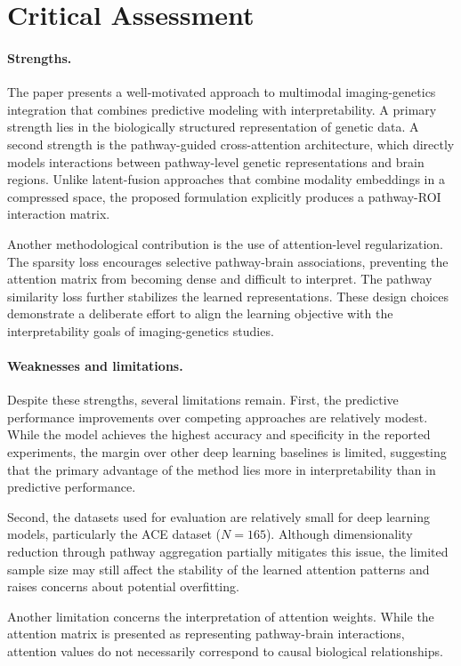 \section{Critical Assessment}

\paragraph{Strengths.}
The paper presents a well-motivated approach to multimodal imaging-genetics integration that combines predictive modeling with interpretability. A primary strength lies in the biologically structured representation of genetic data. A second strength is the pathway-guided cross-attention architecture, which directly models interactions between pathway-level genetic representations and brain regions. Unlike latent-fusion approaches that combine modality embeddings in a compressed space, the proposed formulation explicitly produces a pathway-ROI interaction matrix.

Another methodological contribution is the use of attention-level regularization. The sparsity loss encourages selective pathway-brain associations, preventing the attention matrix from becoming dense and difficult to interpret. The pathway similarity loss further stabilizes the learned representations. These design choices demonstrate a deliberate effort to align the learning objective with the interpretability goals of imaging-genetics studies.

\paragraph{Weaknesses and limitations.}
Despite these strengths, several limitations remain. First, the predictive performance improvements over competing approaches are relatively modest. While the model achieves the highest accuracy and specificity in the reported experiments, the margin over other deep learning baselines is limited, suggesting that the primary advantage of the method lies more in interpretability than in predictive performance.

Second, the datasets used for evaluation are relatively small for deep learning models, particularly the ACE dataset ($N=165$). Although dimensionality reduction through pathway aggregation partially mitigates this issue, the limited sample size may still affect the stability of the learned attention patterns and raises concerns about potential overfitting.

Another limitation concerns the interpretation of attention weights. While the attention matrix is presented as representing pathway-brain interactions, attention values do not necessarily correspond to causal biological relationships.

